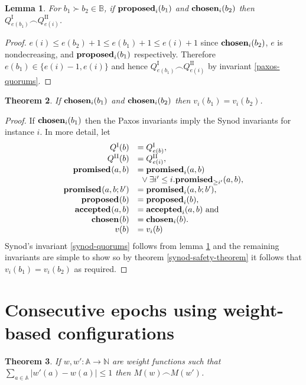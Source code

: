 \documentclass[journal]{IEEEtran}
\newtheorem{theorem}{Theorem}
\newtheorem{lemma}[theorem]{Lemma}
\begin{document}
\begin{lemma}\label{paxos-synod-quorum-invariant} For $b_1 \succ b_2 \in
\mathbb B$, if $\mathbf{proposed}_{i}(b_1)$ and $\mathbf{chosen}_{i}(b_2)$ then
${Q^\textrm{I}_{e(b_1)} \frown Q^\textrm{II}_{e(i)}}$.  \end{lemma}

\begin{proof} $e(i) \le e(b_2) + 1 \le e(b_1) + 1 \le e(i) + 1$ since
$\mathbf{chosen}_{i}(b_2)$, $e$ is nondecreasing, and $\mathbf{proposed}_{i}(b_1)$ respectively.
Therefore $e(b_1) \in \{ e(i) - 1, e(i) \}$ and hence ${Q^\textrm{I}_{e(b_1)}
\frown Q^\textrm{II}_{e(i)}}$ by invariant \ref{paxos-quorums}.  \end{proof}

\begin{theorem}\label{paxos-safety-theorem} If $\mathbf{chosen}_{i}(b_1)$ and
$\mathbf{chosen}_{i}(b_2)$ then ${v_i(b_1) = v_i(b_2)}$.  \end{theorem}

\begin{proof} If $\mathbf{chosen}_{i}(b_1)$ then the Paxos invariants imply the Synod
invariants for instance $i$.  In more detail, let
\[\begin{array}{rl}
Q^\textrm{I}(b) &= Q^\textrm{I}_{e(b)}, \\
Q^\textrm{II}(b) &= Q^\textrm{II}_{e(i)}, \\
\mathbf{promised}_{}(a,b) &= \mathbf{promised}_{i}(a,b) \\
& \ {}\vee \exists i' \le i. \mathbf{promised}_{\ge i'}(a,b), \\
\mathbf{promised}_{}(a,b;b') &= \mathbf{promised}_{i}(a,b;b'), \\
\mathbf{proposed}_{}(b) &= \mathbf{proposed}_{i}(b), \\
\mathbf{accepted}_{}(a,b) &= \mathbf{accepted}_{i}(a,b) \textrm{ and} \\
\mathbf{chosen}_{}(b) &= \mathbf{chosen}_{i}(b). \\
v(b) &= v_i(b)\\
\end{array}
\]
Synod's invariant \ref{synod-quorums} follows from lemma
\ref{paxos-synod-quorum-invariant} and the remaining invariants are simple to
show so by theorem \ref{synod-safety-theorem} it follows that $v_i(b_1) =
v_i(b_2)$ as required.  \end{proof}

\section{Consecutive epochs using weight-based configurations}

\begin{theorem} \label{weights-nearly-equal} If $w, w' : \mathbb A \to \mathbb
N$ are weight functions such that $\sum_{a \in \mathbb A} |w'(a) - w(a)| \le 1$
then $M(w) \frown M(w')$.  \end{theorem}
\end{document}
